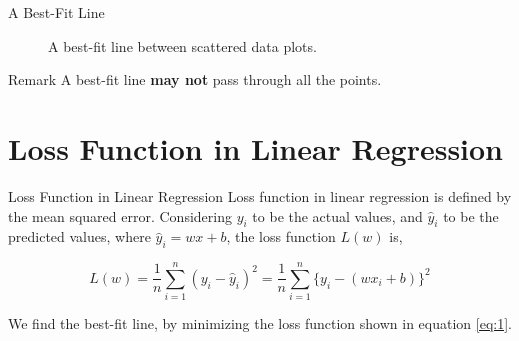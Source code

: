 \documentclass[pdf]{beamer}
\begin{document}
    \begin{frame}{A Best-Fit Line}
        
        \begin{figure}[h!]
        \centering
        \caption{A best-fit line between scattered data plots.}
        \label{fig:linear-regression}
        \end{figure}

        \begin{block}{Remark}
            A best-fit line \textbf{may not} pass through all the points.
        \end{block}
    \end{frame}

    \section{Loss Function in Linear Regression}

    \begin{frame}{Loss Function in Linear Regression}
        Loss function in linear regression is defined by the mean squared error. Considering \(y_i\) to be the actual values, and \(\hat{y}_i\) to be the predicted values, where \(\hat{y}_i=wx+b\), the loss function \(L(w)\) is,

        \begin{equation}\label{eq:1}
            L(w)=\frac{1}{n}\sum_{i=1}^n{(y_i-\hat{y}_i)^2}=\frac{1}{n}\sum_{i=1}^n{\{y_i-(wx_i+b)\}^2}
        \end{equation}

        We find the best-fit line, by minimizing the loss function shown in equation \eqref{eq:1}.
    \end{frame}
\end{document}
